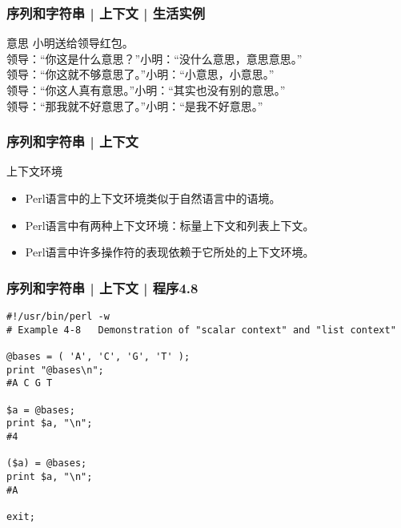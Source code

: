 \begin{frame}
  \frametitle{序列和字符串 | 上下文 | 生活实例}
  \begin{block}{意思}
小明送给领导红包。\\
领导：“你这是什么意思？”\qquad 小明：“没什么意思，意思意思。”\\
领导：“你这就不够意思了。”\quad 小明：“小意思，小意思。”\\
领导：“你这人真有意思。”\qquad 小明：“其实也没有别的意思。”\\
领导：“那我就不好意思了。”\quad 小明：“是我不好意思。”
  \end{block}
\end{frame}

\begin{frame}
  \frametitle{序列和字符串 | 上下文}
  \begin{block}{上下文环境}
    \begin{itemize}
      \item Perl语言中的上下文环境类似于自然语言中的语境。
      \item Perl语言中有两种上下文环境：标量上下文和列表上下文。
      \item Perl语言中许多操作符的表现依赖于它所处的上下文环境。
    \end{itemize}
  \end{block}
\end{frame}

\begin{frame}[fragile]
  \frametitle{序列和字符串 | 上下文 | \alert{程序4.8}}
  \vspace{-1.5em}
\begin{lstlisting}[basicstyle=\small\tt]
#!/usr/bin/perl -w
# Example 4-8   Demonstration of "scalar context" and "list context"

@bases = ( 'A', 'C', 'G', 'T' );
print "@bases\n";
#A C G T

$a = @bases;
print $a, "\n";
#4

($a) = @bases;
print $a, "\n";
#A

exit;
\end{lstlisting}
\end{frame}

